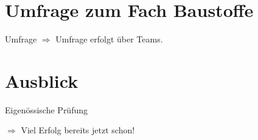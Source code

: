 \section{Umfrage zum Fach Baustoffe}
\begin{frame}{Umfrage}
    $\Rightarrow$ Umfrage erfolgt über Teams.
\end{frame}


\section{Ausblick}
\begin{frame}{Eigenössische Prüfung}

$\Rightarrow$ Viel Erfolg bereits jetzt schon!

\end{frame}


